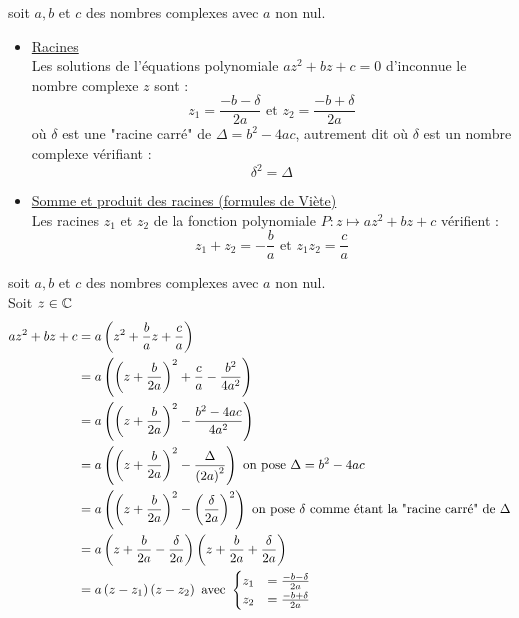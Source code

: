 \begin{defprop}
    soit \(a,b\) et \(c\) des nombres complexes avec \(a\) non nul. \\
    \begin{itemize}
        \item \underline{Racines} \\Les solutions de l'équations polynomiale \(az^2+bz+c=0\) d'inconnue le nombre complexe \(z\) sont : 
        \[z_1 = \frac{-b-\delta}{2a} \text{ et } z_2 = \frac{-b+\delta}{2a}\]
        où \(\delta\) est une "racine carré" de \(\Delta = b^2 -4ac\), autrement dit où \(\delta\) est un nombre complexe vérifiant : 
        \[\delta^2 = \Delta\]
        \item \underline{Somme et produit des racines (formules de Viète)} \\
        Les racines \(z_1\) et \(z_2\) de la fonction polynomiale \(P:z\mapsto az^2 + bz +c \) vérifient :
        \[z_1+z_2 = -\frac{b}{a} \text{ et } z_1z_2 = \frac{c}{a}\]

    \end{itemize}
\end{defprop}

\begin{dem}
    soit \(a,b\) et \(c\) des nombres complexes avec \(a\) non nul. \\
    Soit \(z \in \mathbb{C}\)
    \begin{align*}
        az^2+bz+c &= a\paren{z^2+\frac{b}{a}z+\frac{c}{a}} \\
        &=a\paren{\paren{z+\frac{b}{2a}}^2+\frac{c}{a} - \frac{b^2}{4a^2}} \\
        &=a\paren{\paren{z+\frac{b}{2a}}^2 - \frac{b^2-4ac}{4a^2}} \\
        &=a\paren{\paren{z+\frac{b}{2a}}^2 - \frac{\Delta}{\paren{2a}^2}} \hfill \text{ on pose }\Delta = b^2-4ac\\
        &=a\paren{\paren{z+\frac{b}{2a}}^2 - \paren{\frac{\delta}{2a}}^2} \hfill \text{ on pose }\delta \text{ comme étant la "racine carré" de }\Delta\\
        &=a\paren{z+\frac{b}{2a}-\frac{\delta}{2a}}\paren{z+\frac{b}{2a}+\frac{\delta}{2a}} \\
        &=a\paren{z-z_1}\paren{z-z_2}\hfill \text{ avec } 
        \begin{cases}
            z_1 &= \frac{-b-\delta}{2a} \\
            z_2 &= \frac{-b+\delta}{2a}
        \end{cases}
    \end{align*}
\end{dem}


